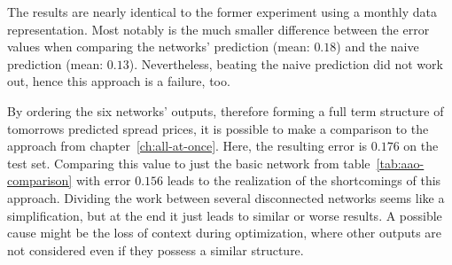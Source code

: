 The results are nearly identical to the former experiment using a monthly data representation. Most notably is the much smaller difference between the error values when comparing the networks' prediction (mean: $0.18$) and the naive prediction (mean: $0.13$). Nevertheless, beating the naive prediction did not work out, hence this approach is a failure, too.

By ordering the six networks' outputs, therefore forming a full term structure of tomorrows predicted spread prices, it is possible to make a comparison to the approach from chapter~\ref{ch:all-at-once}. Here, the resulting error is $0.176$ on the test set. Comparing this value to just the basic network from table~\ref{tab:aao-comparison} with error $0.156$ leads to the realization of the shortcomings of this approach. Dividing the work between several disconnected networks seems like a simplification, but at the end it just leads to similar or worse results. A possible cause might be the loss of context during optimization, where other outputs are not considered even if they possess a similar structure.

 
